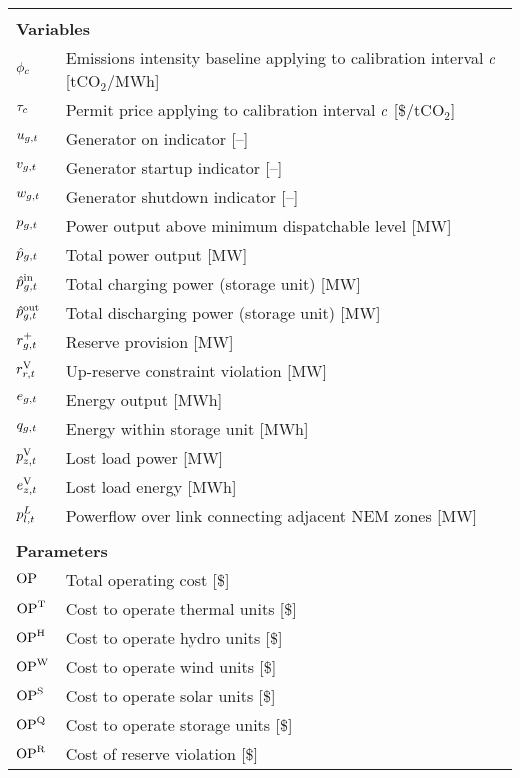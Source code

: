 \documentclass{article}
\begin{document}
\begin{longtable}{ p{}  p{}}
	& \\
	\multicolumn{2}{l}{\textbf{Variables}}\\
	$\phi_{c}$ & Emissions intensity baseline applying to calibration interval $c$ [tCO$_{2}$/MWh]\\
	$\tau_{c}$ & Permit price applying to calibration interval  $c$ [\$/tCO$_{2}$]\\
	$u_{g,t}$ & Generator on indicator [--]\\
	$v_{g,t}$ & Generator startup indicator [--]\\
	$w_{g,t}$ & Generator shutdown indicator [--]\\
	$p_{g,t}$ & Power output above minimum dispatchable level [MW]\\
	$\hat{p}_{g,t}$ & Total power output [MW]\\
	$\hat{p}^{\mathrm{in}}_{g,t}$ & Total charging power (storage unit) [MW]\\
	$\hat{p}^{\mathrm{out}}_{g,t}$ & Total discharging power (storage unit) [MW]\\
	$r^{+}_{g,t}$ & Reserve provision [MW]\\
	$r^{\mathrm{V}}_{r,t}$ & Up-reserve constraint violation [MW]\\
	$e_{g,t}$ & Energy output [MWh]\\
	$q_{g,t}$ & Energy within storage unit [MWh]\\
	$p^{\mathrm{V}}_{z,t}$ & Lost load power [MW]\\
	$e^{\mathrm{V}}_{z,t}$ & Lost load energy [MWh]\\
	$p^{L}_{l,t}$ & Powerflow over link connecting adjacent NEM zones [MW]\\
	& \\
	\multicolumn{2}{l}{\textbf{Parameters}}\\
	$\mathrm{OP}_{}$ & Total operating cost [\$]\\
	$\mathrm{OP}^{\mathrm{T}}_{}$ & Cost to operate thermal units [\$]\\
	$\mathrm{OP}^{\mathrm{H}}_{}$ & Cost to operate hydro units [\$]\\
	$\mathrm{OP}^{\mathrm{W}}_{}$ & Cost to operate wind units [\$]\\
	$\mathrm{OP}^{\mathrm{S}}_{}$ & Cost to operate solar units  [\$]\\
	$\mathrm{OP}^{\mathrm{Q}}_{}$ & Cost to operate storage units [\$]\\
	$\mathrm{OP}^{\mathrm{R}}_{}$ & Cost of reserve violation [\$]\\

\end{longtable}
\end{document}
